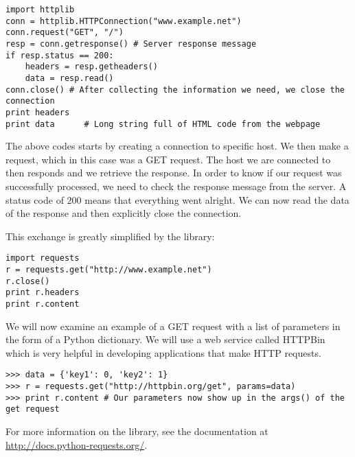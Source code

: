 \begin{lstlisting}
import httplib
conn = httplib.HTTPConnection("www.example.net")
conn.request("GET", "/")
resp = conn.getresponse() # Server response message
if resp.status == 200:
    headers = resp.getheaders()
    data = resp.read()
conn.close() # After collecting the information we need, we close the connection
print headers
print data      # Long string full of HTML code from the webpage
\end{lstlisting}

The above codes starts by creating a connection to specific host.
We then make a request, which in this case was a GET request.
The host we are connected to then responds and we retrieve the response.
In order to know if our request was successfully processed, we need to check the response message from the server.
A status code of $200$ means that everything went alright.
We can now read the data of the response and then explicitly close the connection.

This exchange is greatly simplified by the  library:

\begin{lstlisting}
import requests
r = requests.get("http://www.example.net")
r.close()
print r.headers
print r.content
\end{lstlisting}

We will now examine an example of a GET request with a list of parameters in the form of a Python dictionary.
We will use a web service called HTTPBin which is very helpful in developing applications that make HTTP requests.

\begin{lstlisting}
>>> data = {'key1': 0, 'key2': 1}
>>> r = requests.get("http://httpbin.org/get", params=data)
>>> print r.content # Our parameters now show up in the args() of the get request
\end{lstlisting}

For more information on the  library, see the documentation at \url{http://docs.python-requests.org/}.

\begin{comment}
When we post to a server, we have the option of sending data.
This data can be a file object, a dictionary or a string.
To send our data via post, we first serialize it to JSON and then send the resulting string to the request.
\begin{lstlisting}
>>> p = requests.post("http://httpbin.org/post", data=json.dumps(data))
>>> print p.content
\end{lstlisting}
\end{comment}

